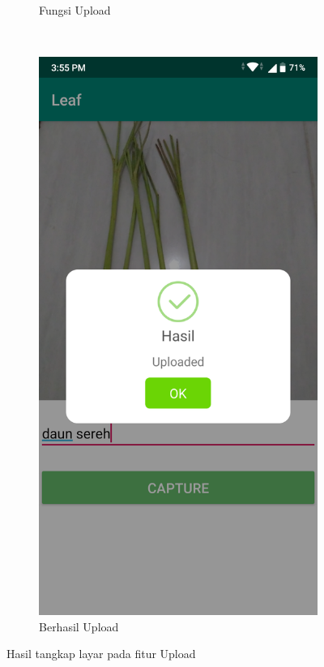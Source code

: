 \begin{figure}[ht]
\begin{subfigure}{0.5\textwidth}
	\caption{Fungsi Upload}
	\label{fig:analisis_label_a}
\end{subfigure}
~
\begin{subfigure}{0.5\textwidth}
	\centering\includegraphics[width=\linewidth]{bab5/figures/uploaded.png}
	\caption{Berhasil Upload}
	\label{fig:analisis_label_b}
\end{subfigure}
\caption{Hasil tangkap layar pada fitur Upload}
\end{figure}

